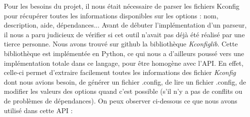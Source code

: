 \documentclass[17pts]{report}
\begin{document}
Pour les besoins du projet, il nous était nécessaire de parser les fichiers
Kconfig pour récupérer toutes les informations disponibles sur les options :
nom, description, aide, dépendances... Avant de débuter l'implémentation d'un
parseur, il nous a paru judicieux de vérifier si cet outil n'avait pas déjà été
réalisé par une tierce personne.
Nous avons trouvé sur github \cite{Existant:lib:kconfiglib} la bibliothèque
\textit{Kconfiglib}. Cette bibliothèque est implémentée en Python, ce qui nous
a d'ailleurs poussé vers une implémentation totale dans ce langage, pour être
homogène avec l'API. En effet, celle-ci permet d'extraire facilement toutes les
informations des fichier \textit{Kconfig} dont nous avions besoin, de générer
un fichier .config, de lire un fichier .config, de modifier les valeurs des
options quand c'est possible (s'il n'y a pas de conflits ou de problèmes de
dépendances).
On peux observer ci-dessous ce que nous avons utilisé dans cette API :
\end{document}
